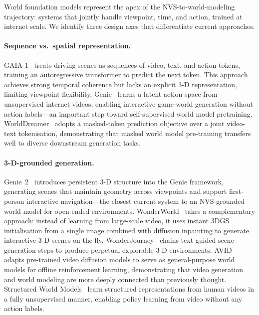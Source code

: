 World foundation models represent the apex of the NVS-to-world-modeling
trajectory: systems that jointly handle viewpoint, time, and action, trained
at internet scale.
We identify three design axes that differentiate current approaches.

\paragraph{Sequence vs.\ spatial representation.}
GAIA-1~\citep{hu2023gaia} treats driving scenes as sequences of video, text,
and action tokens, training an autoregressive transformer to predict the next
token.
This approach achieves strong temporal coherence but lacks an explicit 3-D
representation, limiting viewpoint flexibility.
Genie~\citep{bruce2024genie} learns a latent action space from unsupervised
internet videos, enabling interactive game-world generation without action labels---an
important step toward self-supervised world model pretraining.
WorldDreamer~\citep{worlddreamer2024} adopts a masked-token prediction
objective over a joint video-text tokenisation, demonstrating that masked
world model pre-training transfers well to diverse downstream generation tasks.

\paragraph{3-D-grounded generation.}
Genie~2~\citep{parkerholder2024genie2} introduces persistent 3-D structure
into the Genie framework, generating scenes that maintain geometry across
viewpoints and support first-person interactive navigation---the closest
current system to an NVS-grounded world model for open-ended environments.
WonderWorld~\citep{yu2024wonderworld} takes a complementary approach:
instead of learning from large-scale video, it uses instant 3DGS initialisation
from a single image combined with diffusion inpainting to generate interactive
3-D scenes on the fly.
WonderJourney~\citep{yu2023wonderjourney} chains text-guided scene generation
steps to produce perpetual explorable 3-D environments.
AVID~\citep{rigter2024avid} adapts pre-trained video diffusion models to
serve as general-purpose world models for offline reinforcement learning,
demonstrating that video generation and world modeling are more deeply
connected than previously thought.
Structured World Models~\citep{mendonca2023structured} learn
structured representations from human videos in a fully unsupervised manner,
enabling policy learning from video without any action labels.

